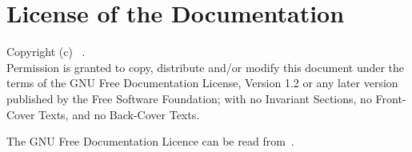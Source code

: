 \chapter{License of the Documentation}
Copyright (c)  \workdateyear~\theauthor.\\

Permission is granted to copy, distribute and/or modify this document
under the terms of the GNU Free Documentation License, Version 1.2
or any later version published by the Free Software Foundation;
with no Invariant Sections, no Front-Cover Texts, and no Back-Cover Texts.

The GNU Free Documentation Licence can be read from~.
